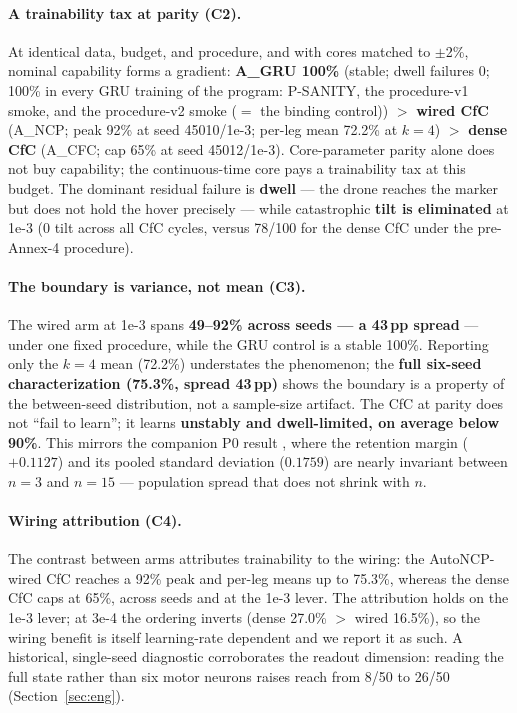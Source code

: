 \documentclass[11pt]{article}
\begin{document}
\paragraph{A trainability tax at parity (C2).} At identical data, budget, and procedure, and with cores matched to $\pm$2\%, nominal capability forms a gradient: \textbf{A\_GRU 100\%} (stable; dwell failures 0; 100\% in every GRU training of the program: P-SANITY, the procedure-v1 smoke, and the procedure-v2 smoke ($=$ the binding control)) $>$ \textbf{wired CfC} (A\_NCP; peak 92\% at seed 45010/1e-3; per-leg mean 72.2\% at $k{=}4$) $>$ \textbf{dense CfC} (A\_CFC; cap 65\% at seed 45012/1e-3). Core-parameter parity alone does not buy capability; the continuous-time core pays a trainability tax at this budget. The dominant residual failure is \textbf{dwell} --- the drone reaches the marker but does not hold the hover precisely --- while catastrophic \textbf{tilt is eliminated} at 1e-3 (0 tilt across all CfC cycles, versus 78/100 for the dense CfC under the pre-Annex-4 procedure).

\paragraph{The boundary is variance, not mean (C3).} The wired arm at 1e-3 spans \textbf{49--92\% across seeds --- a 43\,pp spread} --- under one fixed procedure, while the GRU control is a stable 100\%. Reporting only the $k{=}4$ mean (72.2\%) understates the phenomenon; the \textbf{full six-seed characterization (75.3\%, spread 43\,pp)} shows the boundary is a property of the between-seed distribution, not a sample-size artifact. The CfC at parity does not ``fail to learn''; it learns \textbf{unstably and dwell-limited, on average below 90\%}. This mirrors the companion P0 result \citep{zydziak2026p0}, where the retention margin ($+0.1127$) and its pooled standard deviation ($0.1759$) are nearly invariant between $n{=}3$ and $n{=}15$ --- population spread that does not shrink with $n$.

\paragraph{Wiring attribution (C4).} The contrast between arms attributes trainability to the wiring: the AutoNCP-wired CfC reaches a 92\% peak and per-leg means up to 75.3\%, whereas the dense CfC caps at 65\%, across seeds and at the 1e-3 lever. The attribution holds on the 1e-3 lever; at 3e-4 the ordering inverts (dense 27.0\% $>$ wired 16.5\%), so the wiring benefit is itself learning-rate dependent and we report it as such. A historical, single-seed diagnostic corroborates the readout dimension: reading the full state rather than six motor neurons raises reach from 8/50 to 26/50 (Section~\ref{sec:eng}).
\end{document}
